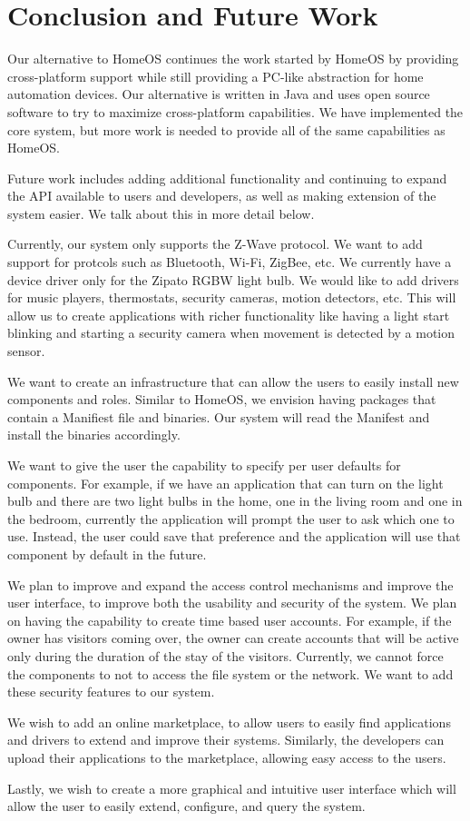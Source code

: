 \section{Conclusion and Future Work}
\label{sec:future}
Our alternative to HomeOS continues the work started by HomeOS by providing
cross-platform support while still providing a PC-like abstraction for home
automation devices. Our alternative is written in Java and uses open source
software to try to maximize cross-platform capabilities. We have implemented the
core system, but more work is needed to provide all of the same capabilities as
HomeOS.

Future work includes adding additional functionality and continuing to expand
the API available to users and developers, as well as making extension of the
system easier. We talk about this in more detail below.

Currently, our system only supports the Z-Wave protocol. We want
to add support for protcols such as Bluetooth, Wi-Fi, ZigBee, etc. We currently
have a device driver only for the Zipato RGBW light bulb. We would like to add
drivers for music players, thermostats, security cameras, motion detectors, etc.
This will allow us to create applications with richer functionality like having
a light start blinking and starting a security camera when movement is detected
by a motion sensor.

We want to create an infrastructure that can allow the users to easily install
new components and roles. Similar to HomeOS, we envision having packages that
contain a Manifiest file and binaries. Our system will read the Manifest and
install the binaries accordingly.

We want to give the user the capability to specify per user defaults for
components. For example, if we have an application that can turn on the light
bulb and there are two light bulbs in the home, one in the living room and one
in the bedroom, currently the application will prompt the user to ask which one
to use. Instead, the user could save that preference and the application will
use that component by default in the future.

We plan to improve and expand the access control mechanisms and improve the user
interface, to improve both the usability and security of the system. We plan on
having the capability to create time based user accounts. For example, if the
owner has visitors coming over, the owner can create accounts that will be
active only during the duration of the stay of the visitors. Currently, we
cannot force the components to not to access the file system or the network. We
want to add these security features to our system.

We wish to add an online marketplace, to allow users to easily find applications
and drivers to extend and improve their systems. Similarly, the developers can
upload their applications to the marketplace, allowing easy access to the users.

Lastly, we wish to create a more graphical and intuitive user interface which
will allow the user to easily extend, configure, and query the system.
